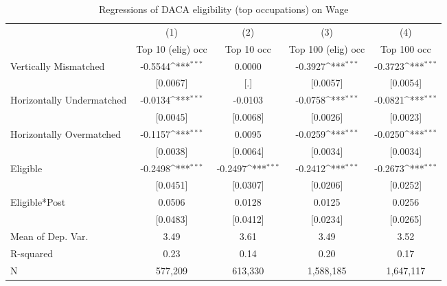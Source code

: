 \begin{table}[htbp]\centering
\def\sym#1{\ifmmode^{#1}\else\(^{#1}\)\fi}
\caption{Regressions of DACA eligibility (top occupations) on Wage}
\begin{tabular}{l*{4}{c}}
\toprule
                    &\multicolumn{1}{c}{(1)}         &\multicolumn{1}{c}{(2)}         &\multicolumn{1}{c}{(3)}         &\multicolumn{1}{c}{(4)}         \\
                    &Top 10 (elig) occ         &  Top 10 occ         &Top 100 (elig) occ         & Top 100 occ         \\
\midrule
Vertically Mismatched&     -0.5544\sym{***}&      0.0000         &     -0.3927\sym{***}&     -0.3723\sym{***}\\
                    &    [0.0067]         &         [.]         &    [0.0057]         &    [0.0054]         \\
\addlinespace
Horizontally Undermatched&     -0.0134\sym{***}&     -0.0103         &     -0.0758\sym{***}&     -0.0821\sym{***}\\
                    &    [0.0045]         &    [0.0068]         &    [0.0026]         &    [0.0023]         \\
\addlinespace
Horizontally Overmatched&     -0.1157\sym{***}&      0.0095         &     -0.0259\sym{***}&     -0.0250\sym{***}\\
                    &    [0.0038]         &    [0.0064]         &    [0.0034]         &    [0.0034]         \\
\addlinespace
Eligible            &     -0.2498\sym{***}&     -0.2497\sym{***}&     -0.2412\sym{***}&     -0.2673\sym{***}\\
                    &    [0.0451]         &    [0.0307]         &    [0.0206]         &    [0.0252]         \\
\addlinespace
Eligible*Post       &      0.0506         &      0.0128         &      0.0125         &      0.0256         \\
                    &    [0.0483]         &    [0.0412]         &    [0.0234]         &    [0.0265]         \\
\midrule
Mean of Dep. Var.   &        3.49         &        3.61         &        3.49         &        3.52         \\
R-squared           &        0.23         &        0.14         &        0.20         &        0.17         \\
N                   &     577,209         &     613,330         &   1,588,185         &   1,647,117         \\

\end{tabular}
\end{table}
